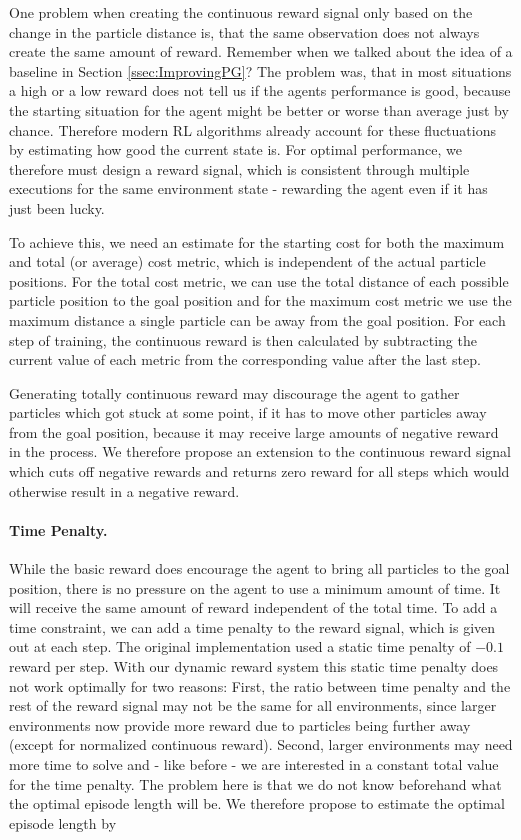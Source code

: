 One problem when creating the continuous reward signal only based on the change in the particle distance is, that the same observation does not always create the same amount of reward. Remember when we talked about the idea of a baseline in Section \ref{ssec:ImprovingPG}? The problem was, that in most situations a high or a low reward does not tell us if the agents performance is good, because the starting situation for the agent might be better or worse than average just by chance. Therefore modern RL algorithms already account for these fluctuations by estimating how good the current state is. For optimal performance, we therefore must design a reward signal, which is consistent through multiple executions for the same environment state - rewarding the agent even if it has just been lucky.

To achieve this, we need an estimate for the starting cost for both the maximum and total (or average) cost metric, which is independent of the actual particle positions. For the total cost metric, we can use the total distance of each possible particle position to the goal position and for the maximum cost metric we use the maximum distance a single particle can be away from the goal position. For each step of training, the continuous reward is then calculated by subtracting the current value of each metric from the corresponding value after the last step. 

Generating totally continuous reward may discourage the agent to gather particles which got stuck at some point, if it has to move other particles away from the goal position, because it may receive large amounts of negative reward in the process. We therefore propose an extension to the continuous reward signal which cuts off negative rewards and returns zero reward for all steps which would otherwise result in a negative reward.

\paragraph{Time Penalty.}
While the basic reward does encourage the agent to bring all particles to the goal position, there is no pressure on the agent to use a minimum amount of time. It will receive the same amount of reward independent of the total time. To add a time constraint, we can add a time penalty to the reward signal, which is given out at each step. The original implementation used a static time penalty of $-0.1$ reward per step. With our dynamic reward system this static time penalty does not work optimally for two reasons: First, the ratio between time penalty and the rest of the reward signal may not be the same for all environments, since larger environments now provide more reward due to particles being further away (except for normalized continuous reward). Second, larger environments may need more time to solve and - like before - we are interested in a constant total value for the time penalty. The problem here is that we do not know beforehand what the optimal episode length will be. We therefore propose to estimate the optimal episode length by

